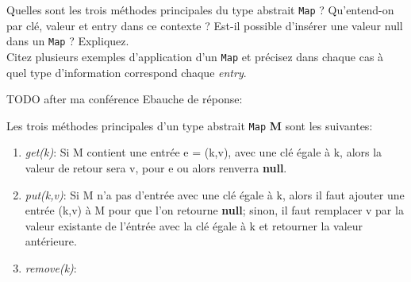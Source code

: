 Quelles sont les trois méthodes principales du type abstrait \texttt{Map} ? Qu’entend-on par clé,
valeur et entry dans ce contexte ? Est-il possible d’insérer une valeur null dans un \texttt{Map} ? Expliquez. \\
Citez plusieurs exemples d’application d’un \texttt{Map} et précisez dans chaque cas à quel type d’information 
correspond chaque \textit{entry}.

TODO after ma conférence 
Ebauche de réponse:

Les trois méthodes principales d'un type abstrait \texttt{Map} \textbf{M} sont les suivantes:
\begin{enumerate}
\item \textit{get(k)}: Si M contient une entrée e = (k,v), avec une clé égale à k, alors la valeur de retour sera v, pour e 
ou alors renverra \textbf{null}.
\item \textit{put(k,v)}: Si M n'a pas d'entrée avec une clé égale à k, alors il faut ajouter une entrée (k,v) à M pour 
que l'on retourne \textbf{null}; sinon, il faut remplacer v par la valeur existante de l'éntrée avec la clé égale à k et retourner 
la valeur antérieure.
\item \textit{remove(k)}:
\end{enumerate}
